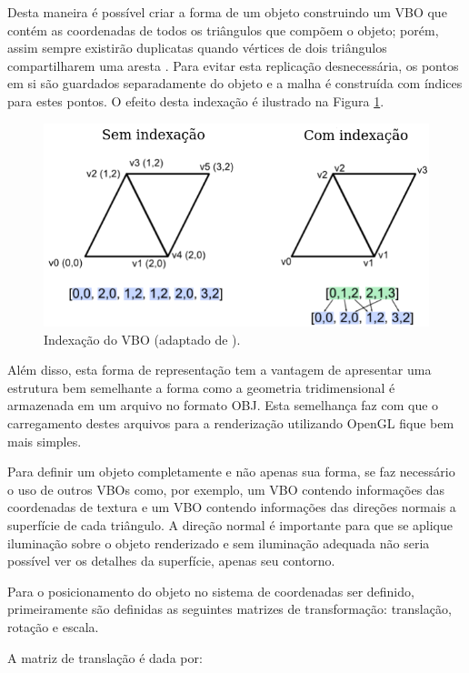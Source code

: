 {%

Desta maneira é possível criar a forma de um objeto construindo um VBO que contém as coordenadas de todos os triângulos que compõem o objeto; porém, assim sempre existirão duplicatas quando vértices de dois triângulos compartilharem uma aresta \cite{openGlTutorial}. Para evitar esta replicação desnecessária, os pontos em si são guardados separadamente do objeto e a malha é construída com índices para estes pontos. O efeito desta indexação é ilustrado na Figura \ref{fig:VBO}.

\begin{figure}[h!]
\centering
\includegraphics[width=.5\linewidth]{figs/TG_VBO_index_pt.png}
\caption{Indexação do VBO (adaptado de \cite{openGlTutorial}).}
\label{fig:VBO}
\end{figure}

Além disso, esta forma de representação tem a  vantagem de apresentar uma estrutura bem semelhante a forma como a geometria tridimensional  é armazenada em um arquivo no formato OBJ. Esta semelhança faz com que o carregamento destes arquivos para a renderização utilizando OpenGL fique bem mais simples.

Para definir um objeto completamente e não apenas sua forma, se faz necessário o uso de outros VBOs como, por exemplo, um VBO contendo informações das coordenadas de textura e um VBO contendo informações das direções normais a superfície de cada triângulo. A direção normal é importante para que se aplique iluminação sobre o objeto renderizado e sem iluminação adequada não seria possível ver os detalhes da superfície, apenas seu contorno.


Para o posicionamento do objeto no sistema de coordenadas ser definido, primeiramente são definidas as seguintes matrizes de transformação: translação, rotação e escala.

A matriz de translação é dada por:

}
